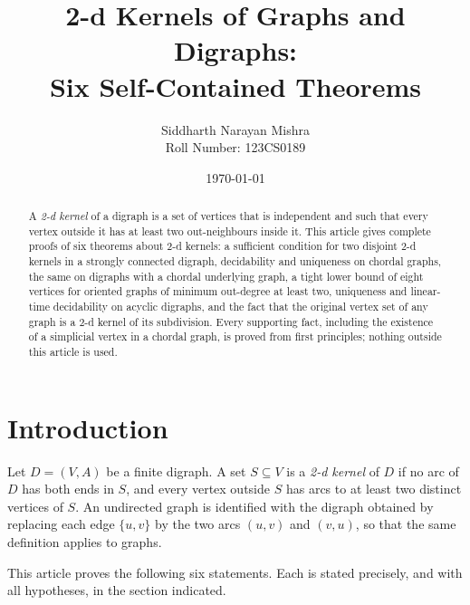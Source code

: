 \documentclass[11pt]{article}
\title{\bfseries 2-d Kernels of Graphs and Digraphs:\\ Six Self-Contained Theorems}
\author{Siddharth Narayan Mishra\\[2pt] Roll Number: 123CS0189}
\date{\today}
\numberwithin{equation}{section}
\theoremstyle{plain}
\newcommand{\V}{V}
\newcommand{\A}{A}
\begin{document}
\maketitle

\begin{abstract}
A \emph{2-d kernel} of a digraph is a set of vertices that is independent and such that
every vertex outside it has at least two out-neighbours inside it. This article gives
complete proofs of six theorems about 2-d kernels: a sufficient condition for two disjoint
2-d kernels in a strongly connected digraph, decidability and uniqueness on chordal graphs,
the same on digraphs with a chordal underlying graph, a tight lower bound of eight
vertices for oriented graphs of minimum out-degree at least two, uniqueness and
linear-time decidability on acyclic digraphs, and the fact that the original vertex set
of any graph is a 2-d kernel of its subdivision. Every supporting fact, including the
existence of a simplicial vertex in a chordal graph, is proved from first principles;
nothing outside this article is used.
\end{abstract}

\tableofcontents

\section{Introduction}

Let $D=(\V,\A)$ be a finite digraph. A set $S\subseteq \V$ is a \emph{2-d kernel} of $D$
if no arc of $D$ has both ends in $S$, and every vertex outside $S$ has arcs to at least
two distinct vertices of $S$. An undirected graph is identified with the digraph obtained
by replacing each edge $\{u,v\}$ by the two arcs $(u,v)$ and $(v,u)$, so that the same
definition applies to graphs.

This article proves the following six statements. Each is stated precisely, and with all
hypotheses, in the section indicated.
\end{document}
